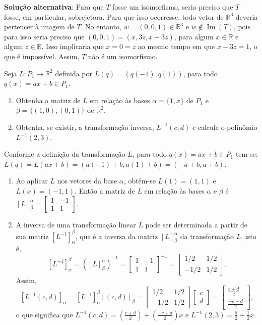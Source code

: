 \documentclass[12pt,a4paper]{article}
\newcommand*\R{\mathbb{R}}
\begin{document}
\begin{ExerciseList}
\textbf{Solução alternativa}: Para que $T$ fosse um isomorfismo, seria preciso que $T$ fosse, em particular, sobrejetora. Para que isso ocorresse, todo vetor de $\R^3$ deveria pertencer à imagem de $T$. No entanto, $w = (0,0,1) \in \R^3$ e $w \not\in \operatorname{Im}(T)$, pois para isso seria preciso que $(0,0,1) = (x,3z,x-3z)$, para algum $x \in \R$ e algum $z \in \R$. Isso implicaria que $x = 0 = z$ ao mesmo tempo em que $x-3z = 1$, o que é impossível. Assim, $T$ não é um isomorfismo.

\Exercise[title={2,0}] Seja $L: P_1 \to \R^2$ definida por $L(q) = (q(-1), q(1))$, para todo $q(x) = ax+b \in P_1$.
\begin{enumerate}
\item Obtenha a matriz de $L$ em relação às bases $\alpha = \{1, x\}$ de $P_1$ e $\beta = \{(1,0),(0,1)\}$ de $\R^2$.
\item Obtenha, se existir, a transformação inversa, $L^{-1}(c,d)$ e calcule o polinômio $L^{-1}(2,3)$.
\end{enumerate}
\Answer Conforme a definição da transformação $L$, para todo $q(x) = ax+b \in P_1$ tem-se: $L(q) = L(ax+b) = (a(-1)+b, a(1)+b) = (-a+b,a+b)$.
\begin{enumerate}
\item Ao aplicar $L$ nos vetores da base $\alpha$, obtém-se $L(1)=(1,1)$ e $L(x)=(-1,1)$. Então a matriz de $L$ em relação às bases $\alpha$ e $\beta$ é $[L]_\beta^\alpha =
\begin{bmatrix}
1 & -1 \\ 1 & 1
\end{bmatrix}$.
\item A inversa de uma transformação linear $L$ pode ser determinada a partir de sua matriz $[L^{-1}]_\alpha^\beta$, que é a inversa da matriz $[L]_\beta^\alpha$ da transformação $L$, isto é,
\[
[L^{-1}]_\alpha^\beta
= ([L]_\beta^\alpha)^{-1}
= \begin{bmatrix}
1 & -1 \\ 1 & 1
\end{bmatrix}^{-1}
= \begin{bmatrix}
1/2 & 1/2 \\ -1/2 & 1/2
\end{bmatrix}.
\]
Assim,
\[
[L^{-1}(c,d)]_{\alpha}
= [L^{-1}]_\alpha^\beta
[(c,d)]_{\beta}
=
\begin{bmatrix}
1/2 & 1/2 \\ -1/2 & 1/2
\end{bmatrix}
\begin{bmatrix}
c\\d
\end{bmatrix}
=
\begin{bmatrix}
\frac{c+d}{2}\\\frac{-c+d}{2}
\end{bmatrix},
\]
o que significa que $L^{-1}(c,d) = \left(\frac{c+d}{2}\right)
+\left(\frac{-c+d}{2}\right)x$ e $L^{-1}(2,3) = \frac{5}{2} + \frac{1}{2}x$.
\end{enumerate}


\end{ExerciseList}
\end{document}
